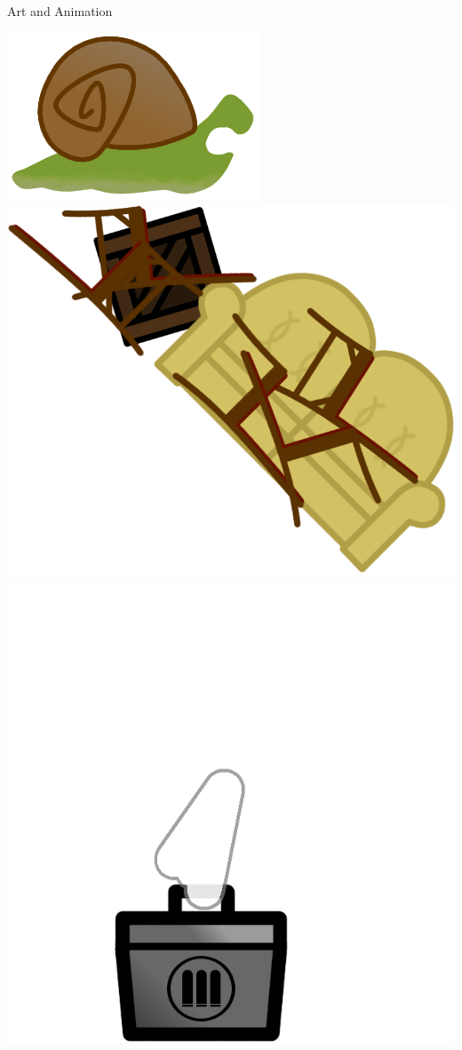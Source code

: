 \documentclass{beamer}
\begin{document}
\begin{frame}{Art and Animation}
  \begin{center}
    \includegraphics[scale=0.15]{snail_teeth.png}
    \includegraphics[scale=0.1]{../game/static/img/barricade_stairs.png}
    \includegraphics[scale=0.1]{../game/static/img/ghost_ammobox.png}

\end{center}
\end{frame}
\end{document}
